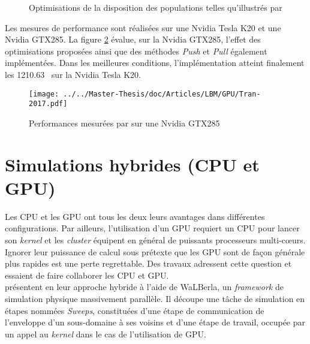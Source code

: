 \begin{figure}[h]
	\centering
	\caption{Optimisations de la disposition des populations telles qu'illustrés par \cite{tran_performance_2017}}
	\label{fig:tran_opt}
\end{figure} 

Les mesures de performance sont réalisées sur une Nvidia Tesla K20 et une Nvidia GTX285. La figure \ref{fig:tran_perf} évalue, sur la Nvidia GTX285, l'effet des optimisations proposées ainsi que des méthodes \textit{Push} et \textit{Pull} également implémentées. Dans les meilleures conditions, l’implémentation atteint finalement les 1210.63~ sur la Nvidia Tesla K20.

\begin{figure}[H]
	\centering
	\texttt{[image: ../../Master-Thesis/doc/Articles/LBM/GPU/Tran-2017.pdf]}
	\caption{Performances mesurées par \cite{tran_performance_2017} sur une Nvidia GTX285}
	\label{fig:tran_perf}
\end{figure} 


\section{Simulations hybrides (\acs{CPU} et \acs{GPU})}
Les \acs{CPU} et les \acs{GPU} ont tous les deux leurs avantages dans différentes configurations. Par ailleurs, l'utilisation d'un \acs{GPU} requiert un \acs{CPU} pour lancer son \textit{kernel} et les \textit{cluster} équipent en général de puissants processeurs multi-cœurs. Ignorer leur puissance de calcul sous prétexte que les \acs{GPU} sont de façon générale plus rapides est une perte regrettable. Des travaux adressent cette question et essaient de faire collaborer les \acs{CPU} et \acs{GPU}.\\

\citet{feichtinger_flexible_2011} présentent en \citeyear{feichtinger_flexible_2011} leur approche hybride à l'aide de WaLBerla, un \textit{framework} de simulation physique massivement parallèle. Il découpe une tâche de simulation en étapes nommées \textit{Sweeps}, constituées d'une étape de communication de l'enveloppe d'un sous-domaine à ses voisins et d'une étape de travail, occupée par un appel au \textit{kernel} dans le cas de l'utilisation de \acs{GPU}. 

